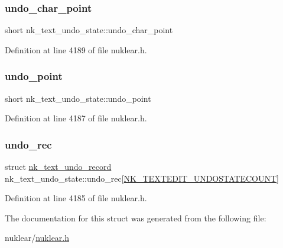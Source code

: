 \subsubsection{\texorpdfstring{undo\+\_\+char\+\_\+point}{undo\_char\_point}}
{\footnotesize\ttfamily short nk\+\_\+text\+\_\+undo\+\_\+state\+::undo\+\_\+char\+\_\+point}



Definition at line 4189 of file nuklear.\+h.

\mbox{\label{structnk__text__undo__state_acad719143b81dc7d2463c1d06f03c672}} 
\subsubsection{\texorpdfstring{undo\+\_\+point}{undo\_point}}
{\footnotesize\ttfamily short nk\+\_\+text\+\_\+undo\+\_\+state\+::undo\+\_\+point}



Definition at line 4187 of file nuklear.\+h.

\mbox{\label{structnk__text__undo__state_ad8d4523c523f3f1a90fcc709f4db8756}} 
\subsubsection{\texorpdfstring{undo\+\_\+rec}{undo\_rec}}
{\footnotesize\ttfamily struct \mbox{\hyperlink{structnk__text__undo__record}{nk\+\_\+text\+\_\+undo\+\_\+record}} nk\+\_\+text\+\_\+undo\+\_\+state\+::undo\+\_\+rec\mbox{[}\mbox{\hyperlink{nuklear_8h_a473dfa38f3ce823a5368c892ab7b13fc}{N\+K\+\_\+\+T\+E\+X\+T\+E\+D\+I\+T\+\_\+\+U\+N\+D\+O\+S\+T\+A\+T\+E\+C\+O\+U\+NT}}\mbox{]}}



Definition at line 4185 of file nuklear.\+h.



The documentation for this struct was generated from the following file\+:\begin{DoxyCompactItemize}
\item 
nuklear/\mbox{\hyperlink{nuklear_8h}{nuklear.\+h}}\end{DoxyCompactItemize}
